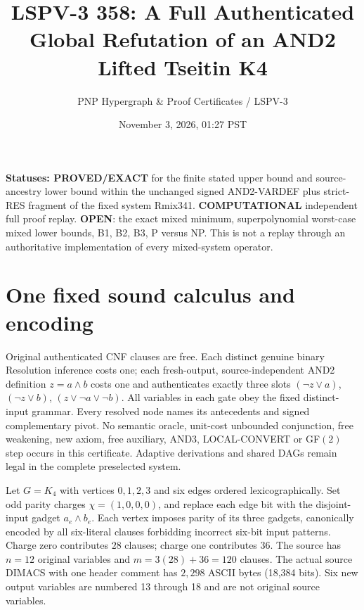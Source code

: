 \documentclass[11pt]{article}
\title{LSPV-3 358: A Full Authenticated Global Refutation of an AND2 Lifted Tseitin K4}
\author{PNP Hypergraph \& Proof Certificates / LSPV-3}
\date{November 3, 2026, 01:27 PST}
\begin{document}
\maketitle
\noindent\textbf{Statuses: PROVED/EXACT} for the finite stated upper bound and source-ancestry lower bound within the unchanged signed AND2-VARDEF plus strict-RES fragment of the fixed system Rmix341. \textbf{COMPUTATIONAL} independent full proof replay. \textbf{OPEN}: the exact mixed minimum, superpolynomial worst-case mixed lower bounds, B1, B2, B3, P versus NP. This is not a replay through an authoritative implementation of every mixed-system operator.

\section*{One fixed sound calculus and encoding}
Original authenticated CNF clauses are free. Each distinct genuine binary Resolution inference costs one; each fresh-output, source-independent AND2 definition $z=a\wedge b$ costs one and authenticates exactly three slots $(\neg z\vee a)$, $(\neg z\vee b)$, $(z\vee\neg a\vee\neg b)$. All variables in each gate obey the fixed distinct-input grammar. Every resolved node names its antecedents and signed complementary pivot. No semantic oracle, unit-cost unbounded conjunction, free weakening, new axiom, free auxiliary, AND3, LOCAL-CONVERT or GF$(2)$ step occurs in this certificate. Adaptive derivations and shared DAGs remain legal in the complete preselected system.

Let $G=K_4$ with vertices $0,1,2,3$ and six edges ordered lexicographically. Set odd parity charges $\chi=(1,0,0,0)$, and replace each edge bit with the disjoint-input gadget $a_e\wedge b_e$. Each vertex imposes parity of its three gadgets, canonically encoded by all six-literal clauses forbidding incorrect six-bit input patterns. Charge zero contributes $28$ clauses; charge one contributes $36$. The source has $n=12$ original variables and $m=3(28)+36=120$ clauses. The actual source DIMACS with one header comment has $2,298$ ASCII bytes (18,384 bits). Six new output variables are numbered 13 through 18 and are not original source variables.
\end{document}
